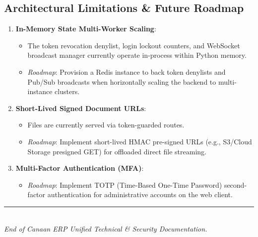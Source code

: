 \documentclass[11pt,a4paper]{article}
\begin{document}
\subsection{Architectural Limitations \& Future Roadmap}
\begin{enumerate}[leftmargin=1.4em,itemsep=4pt]
  \item \textbf{In-Memory State Multi-Worker Scaling}:
  \begin{itemize}[leftmargin=1.2em,itemsep=2pt]
    \item The token revocation denylist, login lockout counters, and WebSocket broadcast manager currently operate in-process within Python memory.
    \item \textit{Roadmap}: Provision a Redis instance to back token denylists and Pub/Sub broadcasts when horizontally scaling the backend to multi-instance clusters.
  \end{itemize}
  \item \textbf{Short-Lived Signed Document URLs}:
  \begin{itemize}[leftmargin=1.2em,itemsep=2pt]
    \item Files are currently served via token-guarded routes.
    \item \textit{Roadmap}: Implement short-lived HMAC pre-signed URLs (e.g., S3/Cloud Storage presigned GET) for offloaded direct file streaming.
  \end{itemize}
  \item \textbf{Multi-Factor Authentication (MFA)}:
  \begin{itemize}[leftmargin=1.2em,itemsep=2pt]
    \item \textit{Roadmap}: Implement TOTP (Time-Based One-Time Password) second-factor authentication for administrative accounts on the web client.
  \end{itemize}
\end{enumerate}

\vspace{1.5cm}
\begin{center}
{\color{rulegray}\rule{0.6\textwidth}{0.6pt}}\\[6pt]
{\itshape\color{codecomment} End of Canaan ERP Unified Technical \& Security Documentation.}
\end{center}
\end{document}
